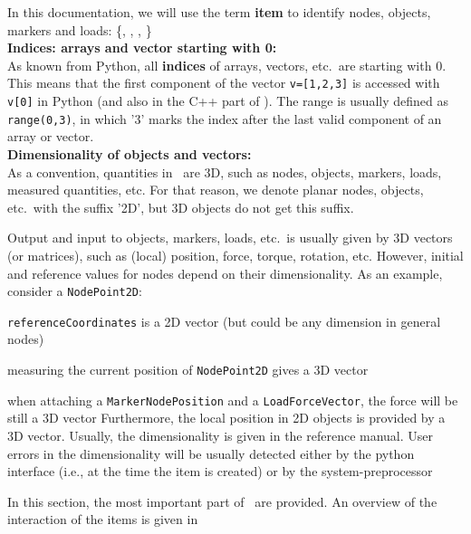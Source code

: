 In this documentation, we will use the term {\bf item} to identify nodes, objects, markers and loads:
\be
   \in \{, , ,  \}
\ee
\vspace{12pt}\\
{\bf Indices: arrays and vector starting with 0:} \vspace{6pt}\\
As known from Python, all {\bf indices} of arrays, vectors, etc.\ are starting with 0. This means that the first component of the vector \texttt{v=[1,2,3]} is accessed with \texttt{v[0]} in Python (and also in the C++ part of \codeName ). The range is usually defined as \texttt{range(0,3)}, in which '3' marks the index after the last valid component of an array or vector.
%
\vspace{12pt}\\
{\bf Dimensionality of objects and vectors:}\vspace{6pt}\\ 
As a convention, quantities in \codeName\ are 3D, such as nodes, objects, markers, loads, measured quantities, etc. 
For that reason, we denote planar nodes, objects, etc.\ with the suffix '2D', but 3D objects do not get this suffix.

Output and input to objects, markers, loads, etc.\ is usually given by 3D vectors (or matrices), such as (local) position, force, torque, rotation, etc. However, initial and reference values for nodes depend on their dimensionality.
As an example, consider a \texttt{NodePoint2D}:
\bi
  \item \texttt{referenceCoordinates} is a 2D vector (but could be any dimension in general nodes)
	\item measuring the current position of \texttt{NodePoint2D} gives a 3D vector
	\item when attaching a \texttt{MarkerNodePosition} and a \texttt{LoadForceVector}, the force will be still a 3D vector
\ei
Furthermore, the local position in 2D objects is provided by a 3D vector. Usually, the dimensionality is given in the reference manual. User errors in the dimensionality will be usually detected either by the python interface (i.e., at the time the item is created) or by the system-preprocessor

 \label{sec_items}
%
In this section, the most important part of \codeName\ are provided. An overview of the interaction of the items is given in 

